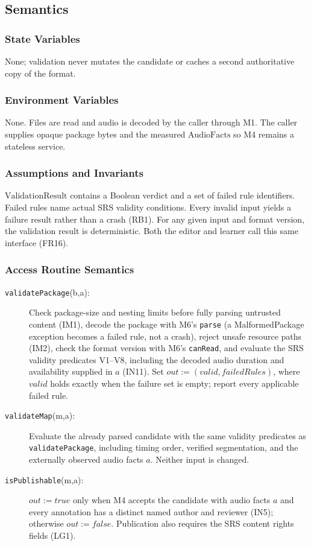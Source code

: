 \documentclass[12pt, titlepage]{article}
\begin{document}
\subsection{Semantics}
\subsubsection{State Variables}
None; validation never mutates the candidate or caches
a second authoritative copy of the format.

\subsubsection{Environment Variables}
None. Files are read and audio is decoded by the caller through
M1. The caller supplies opaque package bytes and the measured
$\mathrm{AudioFacts}$ so M4 remains a stateless service.

\subsubsection{Assumptions and Invariants}
$\mathrm{ValidationResult}$ contains a Boolean verdict and
a set of failed rule identifiers. Failed rules name actual
SRS validity conditions. Every invalid input yields a
failure result rather than a crash (RB1). For any given
input and format version, the validation result is
deterministic. Both the editor and learner call this same
interface (FR16).

\subsubsection{Access Routine Semantics}
\begin{description}
\item[\texttt{validatePackage}(b,a):] Check package-size and
nesting limits before fully parsing untrusted content
(IM1), decode the package with M6's \texttt{parse} (a
MalformedPackage exception becomes a failed rule, not a
crash), reject unsafe resource paths (IM2), check the
format version with M6's \texttt{canRead}, and evaluate the SRS
validity predicates V1--V8, including the decoded audio
duration and availability supplied in $a$ (IN11). Set
$out:=(\mathit{valid},\mathit{failedRules})$, where
$\mathit{valid}$ holds exactly when the failure set is
empty; report every applicable failed rule.
\item[\texttt{validateMap}(m,a):] Evaluate the already parsed
candidate with the same validity predicates as
\texttt{validatePackage}, including timing order, verified
segmentation, and the externally observed audio facts $a$.
Neither input is changed.
\item[\texttt{isPublishable}(m,a):] $out:=\mathit{true}$
only when M4 accepts the candidate with audio facts $a$
and every annotation
has a distinct named author and reviewer (IN5);
otherwise $out:=\mathit{false}$. Publication also
requires the SRS content rights fields (LG1).
\end{description}
\end{document}
